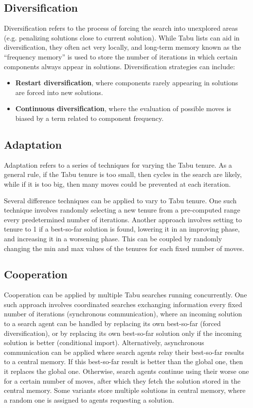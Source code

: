 \documentclass[12pt,titlepage]{article}
\begin{document}
    \subsection{Diversification}
      Diversification refers to the process of forcing the search into unexplored areas (e.g. penalizing solutions close to current solution). While Tabu lists can aid
      in diversification, they often act very locally, and long-term memory known as the ``frequency memory'' is used to store the number of iterations in which certain
      components always appear in solutions. Diversification strategies can include:
      \begin{itemize}
        \item \textbf{Restart diversification}, where components rarely appearing in solutions are forced into new solutions.
        \item \textbf{Continuous diversification}, where the evaluation of possible moves is biased by a term related to component frequency.
      \end{itemize}

    \subsection{Adaptation}
      Adaptation refers to a series of techniques for varying the Tabu tenure. As a general rule, if the Tabu tenure is too small, then cycles in the search are likely,
      while if it is too big, then many moves could be prevented at each iteration.

      Several difference techniques can be applied to vary to Tabu tenure. One such technique involves randomly selecting a new tenure from a pre-computed range every
      predetermined number of iterations. Another approach involves setting to tenure to 1 if a best-so-far solution is found, lowering it in an improving phase, and
      increasing it in a worsening phase. This can be coupled by randomly changing the min and max values of the tenures for each fixed number of moves.

    \subsection{Cooperation}
      Cooperation can be applied by multiple Tabu searches running concurrently. One such approach involves coordinated searches exchanging information every fixed number
      of iterations (synchronous communication), where an incoming solution to a search agent can be handled by replacing its own best-so-far (forced diversification),
      or by replacing its own best-so-far solution only if the incoming solution is better (conditional import). Alternatively, asynchronous communication can be applied
      where search agents relay their best-so-far results to a central memory. If this best-so-far result is better than the global one, then it replaces the global one.
      Otherwise, search agents continue using their worse one for a certain number of moves, after which they fetch the solution stored in the central memory. Some variants
      store multiple solutions in central memory, where a random one is assigned to agents requesting a solution.
\end{document}
